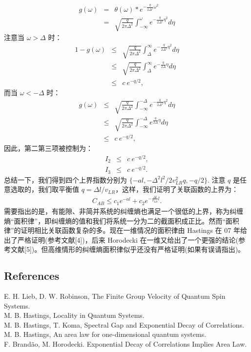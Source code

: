\documentclass[10pt,UTF8]{ctexart}
\begin{document}
\begin{eqnarray}
	g(\omega) 
	&=& \theta(\omega) * e^{-\frac{q}{2\Delta^2} \omega^2} \nonumber \\
	&=& \sqrt{\frac{q}{2\pi \Delta^2}}\int_{-\infty}^{\omega} e^{-\frac{q}{2\Delta^2} \eta^2} d\eta
\end{eqnarray}
注意当 $\omega > \Delta$ 时：
\begin{eqnarray}
	1 - g(\omega) 
	&\le & \sqrt{\frac{q}{2\pi \Delta^2}}\int_{\Delta}^{\infty} e^{-\frac{q}{2\Delta^2} \eta^2} d\eta \nonumber \\
	&\le & \sqrt{\frac{q}{2\pi \Delta^2}}\int_{\Delta}^{\infty} e^{-\frac{q}{2\Delta} \eta} d\eta \nonumber \\
	&\le & c\ e^{-q/2},
\end{eqnarray}
而当 $\omega < -\Delta$ 时：
\begin{eqnarray}
	g(\omega) 
	&\le & \sqrt{\frac{q}{2\pi \Delta^2}}\int_{-\infty}^{-\Delta} e^{-\frac{q}{2\Delta^2} \eta^2} d\eta \nonumber \\
	&\le & \sqrt{\frac{q}{2\pi \Delta^2}}\int_{-\infty}^{-\Delta} e^{\frac{q}{2\Delta} \eta} d\eta \nonumber \\
	&\le & c\ e^{-q/2},
\end{eqnarray}
因此，第二第三项被控制为：
\begin{eqnarray}
	I_2 &\le & c\ e^{-q/2}, \\
	I_3 &\le & c\ e^{-q/2}.
\end{eqnarray}
总结一下，我们得到四个上界指数分别为 $\{-al, -\Delta^2l^2/2v_{LR}^2q, -q/2\}$. 注意 $q$ 是任意选取的，我们取平衡值 $q = \Delta l/v_{LR}$，这样，我们证明了关联函数的上界为：
\begin{eqnarray}
	C_{AB} \le c_1 e^{-al} + c_2 e^{-\frac{\Delta l}{v_{LR}}l}.
\end{eqnarray}
需要指出的是，有能隙、非简并系统的纠缠熵也满足一个很低的上界，称为纠缠熵“面积律”，即纠缠熵的值和我们将系统一分为二的截面积成正比。然而“面积律”的证明相比关联函数复杂的多。现在一维情况的面积律由 Hastings 在 07 年给出了严格证明(参考文献[4])，后来 Horodecki 在一维又给出了一个更强的结论(参考文献[5])。但高维情形的纠缠熵面积律似乎还没有严格证明(如果有误请指出)。

\subsection*{References}
\noindent
[1] E. H. Lieb, D. W. Robinson, The Finite Group Velocity of Quantum Spin Systems. \\
\noindent 
[2] M. B. Hastings, Locality in Quantum Systems. \\
\noindent
[3] M. B. Hastings, T. Koma, Spectral Gap and Exponential Decay of Correlations. \\
\noindent
[4] M. B. Hastings, An area law for one-dimensional quantum systems. \\
\noindent
[5] F. Brandão, M. Horodecki. Exponential Decay of Correlations Implies Area Law.

\end{document}
